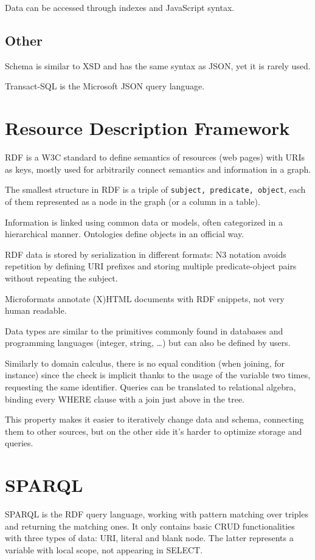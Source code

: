 Data can be accessed through indexes and JavaScript syntax.

\subsection{Other}
Schema is similar to XSD and has the same syntax as JSON, yet it is rarely used.

Transact-SQL is the Microsoft JSON query language.

\section{Resource Description Framework}
RDF is a W3C standard to define semantics of resources (web pages) with URIs as keys, mostly used for arbitrarily connect semantics and information in a graph. 

The smallest structure in RDF is a triple of \texttt{subject, predicate, object}, each of them represented as a node in the graph (or a column in a table). 

Information is linked using common data or models, often categorized in a hierarchical manner. Ontologies define objects in an official way.

RDF data is stored by serialization in different formats: N3 notation avoids repetition by defining URI prefixes and storing multiple predicate-object pairs without repeating the subject.

Microformats annotate (X)HTML documents with RDF snippets, not very human readable. 

Data types are similar to the primitives commonly found in databases and programming languages (integer, string, \dots) but can also be defined by users. 


Similarly to domain calculus, there is no equal condition (when joining, for instance) since the check is implicit thanks to the usage of the variable two times, requesting the same identifier. Queries can be translated to relational algebra, binding every WHERE clause with a join just above in the tree.

This property makes it easier to iteratively change data and schema, connecting them to other sources, but on the other side it's harder to optimize storage and queries.

\section{SPARQL}
SPARQL is the RDF query language, working with pattern matching over triples and returning the matching ones. It only contains basic CRUD functionalities with three types of data: URI, literal and blank node. The latter represents a variable with local scope, not appearing in SELECT.

